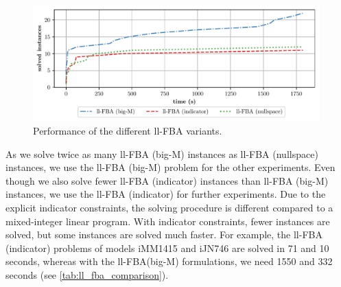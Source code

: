 \begin{figure}[h!]
    \centering
    \includegraphics[width=0.983\textwidth]{Images/fba_variants_comparison_plot.pdf}
    \caption{\label{fig:ll_fba_comparison} Performance of the different \textsf{ll-FBA} variants.}
\end{figure}

\newpage
As we solve twice as many \textsf{ll-FBA (big-M)} instances as \textsf{ll-FBA (nullspace)} instances, we use the \textsf{ll-FBA (big-M)} problem for the other experiments. Even though we also solve fewer \textsf{ll-FBA (indicator)} instances than \textsf{ll-FBA (big-M)} instances, we use the \textsf{ll-FBA (indicator)} for further experiments. Due to the explicit indicator constraints, the solving procedure is different compared to a mixed-integer linear program. With indicator constraints, fewer instances are solved, but some instances are solved much faster. For example, the \textsf{ll-FBA (indicator)} problems of models \textsf{iMM1415} and \textsf{iJN746} are solved in 71 and 10 seconds, whereas with the \textsf{ll-FBA(big-M)} formulations, we need 1550 and 332 seconds (see \cref{tab:ll_fba_comparison}). %

